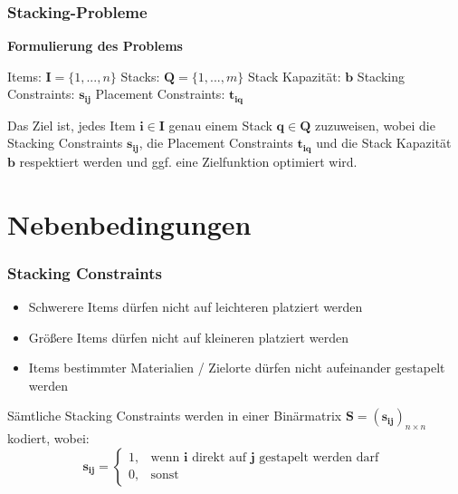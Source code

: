 \documentclass{beamer}
\begin{document}
\begin{frame}
\frametitle{Stacking-Probleme}

\textbf{Formulierung des Problems}\newline

Items: $\boldsymbol{I} = \{1, ..., n\}$\newline
Stacks: $\boldsymbol{Q} = \{1, ..., m\}$\newline
Stack Kapazität: $\boldsymbol{b}$\newline
Stacking Constraints: $\boldsymbol{s_{ij}}$\newline
Placement Constraints: $\boldsymbol{t_{iq}}$\newline

Das Ziel ist, jedes Item $\boldsymbol{i} \in \boldsymbol{I}$ genau einem Stack $\boldsymbol{q} \in \boldsymbol{Q}$ zuzuweisen,
wobei die Stacking Constraints $\boldsymbol{s_{ij}}$, die Placement Constraints $\boldsymbol{t_{iq}}$ und die Stack Kapazität $\boldsymbol{b}$ respektiert werden und ggf. eine Zielfunktion optimiert wird.
\end{frame}

\section{Nebenbedingungen}

\begin{frame}
\frametitle{Stacking Constraints}
\begin{itemize}
    \item Schwerere Items dürfen nicht auf leichteren platziert werden
    \item Größere Items dürfen nicht auf kleineren platziert werden
    \item Items bestimmter Materialien / Zielorte dürfen nicht aufeinander gestapelt werden\newline
\end{itemize}
Sämtliche Stacking Constraints werden in einer Binärmatrix $\boldsymbol{S} = (\boldsymbol{s_{ij}})_{n \times n}$ kodiert, wobei:
\[
    \boldsymbol{s_{ij}} =
\begin{cases}
    1, & \text{wenn $\boldsymbol{i}$ direkt auf $\boldsymbol{j}$ gestapelt werden darf }\\
    0, & \text{sonst}
\end{cases}
\]
\end{frame}
\end{document}

